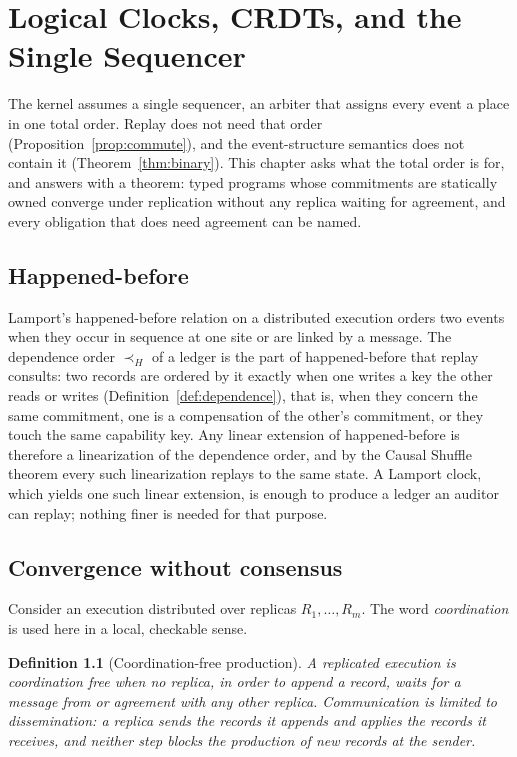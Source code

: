 \documentclass[11pt,openany]{book}
\newtheorem{definition}[theorem]{Definition}
\theoremstyle{remark}
\begin{document}
\chapter{Logical Clocks, CRDTs, and the Single Sequencer}
\label{ch:sequencer}

The kernel assumes a single sequencer, an arbiter that assigns every event
a place in one total order. Replay does not need that order
(Proposition~\ref{prop:commute}), and the event-structure semantics does
not contain it (Theorem~\ref{thm:binary}). This chapter asks what the
total order is for, and answers with a theorem: typed programs whose
commitments are statically owned converge under replication without any
replica waiting for agreement, and every obligation that does need
agreement can be named.

\section{Happened-before}

Lamport's happened-before relation on a distributed execution orders two
events when they occur in sequence at one site or are linked by a
message. The dependence order $\prec_H$ of a ledger is the part of
happened-before that replay consults: two records are ordered by it
exactly when one writes a key the other reads or writes
(Definition~\ref{def:dependence}), that is, when they concern the same
commitment, one is a compensation of the other's commitment, or they
touch the same capability key. Any linear extension of happened-before is
therefore a linearization of the dependence order, and by the Causal
Shuffle theorem every such linearization replays to the same state. A
Lamport clock, which yields one such linear extension, is enough to
produce a ledger an auditor can replay; nothing finer is needed for that
purpose.

\section{Convergence without consensus}

Consider an execution distributed over replicas $R_1,\ldots,R_m$. The
word \emph{coordination} is used here in a local, checkable sense.

\begin{definition}[Coordination-free production]\label{def:coordfree}
A replicated execution is \emph{coordination free} when no replica, in
order to append a record, waits for a message from or agreement with any
other replica. Communication is limited to dissemination: a replica
sends the records it appends and applies the records it receives, and
neither step blocks the production of new records at the sender.
\end{definition}
\end{document}
